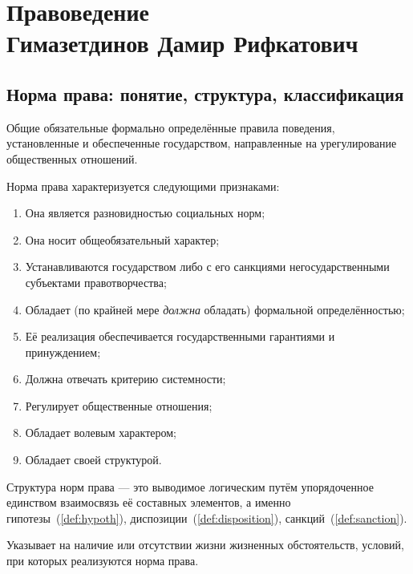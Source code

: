 \part[Правоведение]{
Правоведение \\
{\Large Гимазетдинов Дамир Рифкатович}
}

\chapter{Норма права: понятие, структура, классификация}

\begin{definition}
	Общие обязательные формально определённые правила поведения,
	установленные и обеспеченные государством, направленные на
	урегулирование общественных отношений.
\end{definition}

Норма права характеризуется следующими признаками:

\begin{enumerate}
	\item Она является разновидностью социальных норм;
	\item Она носит общеобязательный характер;
	\item Устанавливаются государством либо с его санкциями
	      негосударственными субъектами правотворчества;
	\item Обладает (по крайней мере \emph{должна} обладать) формальной
	      определённостью;
	\item Её реализация обеспечивается государственными гарантиями и принуждением;
	\item Должна отвечать критерию системности;
	\item Регулирует общественные отношения;
	\item Обладает волевым характером;
	\item Обладает своей структурой.
\end{enumerate}

Структура норм права --- это выводимое логическим путём упорядоченное единством
взаимосвязь её составных элементов, а именно
гипотезы~(\ref{def:hypoth}), диспозиции~(\ref{def:disposition}),
санкций~(\ref{def:sanction}).

\begin{definition}[Гипотеза]\label{def:hypoth}
	Указывает на наличие или отсутствии жизни жизненных обстоятельств,
	условий, при которых реализуются норма права.
\end{definition}

